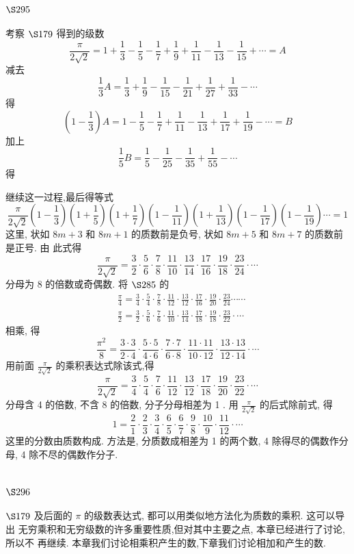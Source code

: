 \section{$\S 295$}

考察 $\S 179$ 得到的级数
\[
\frac{\pi}{2 \sqrt{2}}=1+\frac{1}{3}-\frac{1}{5}-\frac{1}{7}+\frac{1}{9}+\frac{1}{11}-\frac{1}{13}-\frac{1}{15}+\cdots=A
\]
减去
\[
\frac{1}{3} A=\frac{1}{3}+\frac{1}{9}-\frac{1}{15}-\frac{1}{21}+\frac{1}{27}+\frac{1}{33}-\cdots
\]
得
\[
\left(1-\frac{1}{3}\right) A=1-\frac{1}{5}-\frac{1}{7}+\frac{1}{11}-\frac{1}{13}+\frac{1}{17}+\frac{1}{19}-\cdots=B
\]
加上
\[
\frac{1}{5} B=\frac{1}{5}-\frac{1}{25}-\frac{1}{35}+\frac{1}{55}-\cdots
\]
得 

继续这一过程,最后得等式
\[
\frac{\pi}{2 \sqrt{2}}\left(1-\frac{1}{3}\right)\left(1+\frac{1}{5}\right)\left(1+\frac{1}{7}\right)\left(1-\frac{1}{11}\right)\left(1+\frac{1}{13}\right)\left(1-\frac{1}{17}\right)\left(1-\frac{1}{19}\right) \cdots=1
\]
这里, 状如 $8 m+3$ 和 $8 m+1$ 的质数前是负号, 状如 $8 m+5$ 和 $8 m+7$ 的质数前是正号. 由 此式得
\[
\frac{\pi}{2 \sqrt{2}}=\frac{3}{2} \cdot \frac{5}{6} \cdot \frac{7}{8} \cdot \frac{11}{10} \cdot \frac{13}{14} \cdot \frac{17}{16} \cdot \frac{19}{18} \cdot \frac{23}{24} \cdot \cdots
\]
分母为 8 的倍数或奇偶数. 将 $\S 285$ 的
\[
\begin{aligned}
& \frac{\pi}{4}=\frac{3}{4} \cdot \frac{5}{4} \cdot \frac{7}{8} \cdot \frac{11}{12} \cdot \frac{13}{12} \cdot \frac{17}{16} \cdot \frac{19}{20} \cdot \frac{23}{24} \cdots \cdots \\
& \frac{\pi}{2}=\frac{3}{2} \cdot \frac{5}{6} \cdot \frac{7}{6} \cdot \frac{11}{10} \cdot \frac{13}{14} \cdot \frac{17}{18} \cdot \frac{19}{18} \cdot \frac{23}{22} \cdot \cdots
\end{aligned}
\]
相乘, 得
\[
\frac{\pi^{2}}{8}=\frac{3 \cdot 3}{2 \cdot 4} \cdot \frac{5 \cdot 5}{4 \cdot 6} \cdot \frac{7 \cdot 7}{6 \cdot 8} \cdot \frac{11 \cdot 11}{10 \cdot 12} \cdot \frac{13 \cdot 13}{12 \cdot 14} \cdot \cdots
\]
用前面 $\frac{\pi}{2 \sqrt{2}}$ 的乘积表达式除该式,得
\[
\frac{\pi}{2 \sqrt{2}}=\frac{3}{4} \cdot \frac{5}{4} \cdot \frac{7}{6} \cdot \frac{11}{12} \cdot \frac{13}{12} \cdot \frac{17}{18} \cdot \frac{19}{20} \cdot \frac{23}{22} \cdot \cdots
\]
分母含 4 的倍数, 不含 8 的倍数, 分子分母相差为 1 . 用 $\frac{\pi}{2 \sqrt{2}}$ 的后式除前式, 得
\[
1=\frac{2}{1} \cdot \frac{2}{3} \cdot \frac{3}{4} \cdot \frac{6}{5} \cdot \frac{6}{7} \cdot \frac{9}{8} \cdot \frac{10}{9} \cdot \frac{11}{12} \cdot \cdots
\]
这里的分数由质数构成. 方法是, 分质数成相差为 1 的两个数, 4 除得尽的偶数作分母, 4 除不尽的偶数作分子.

\section{$\S 296$}

$\S 179$ 及后面的 $\pi$ 的级数表达式, 都可以用类似地方法化为质数的乘积. 这可以导出 无穷乘积和无穷级数的许多重要性质,但对其中主要之点, 本章已经进行了讨论, 所以不 再继续. 本章我们讨论相乘积产生的数,下章我们讨论相加和产生的数. 

